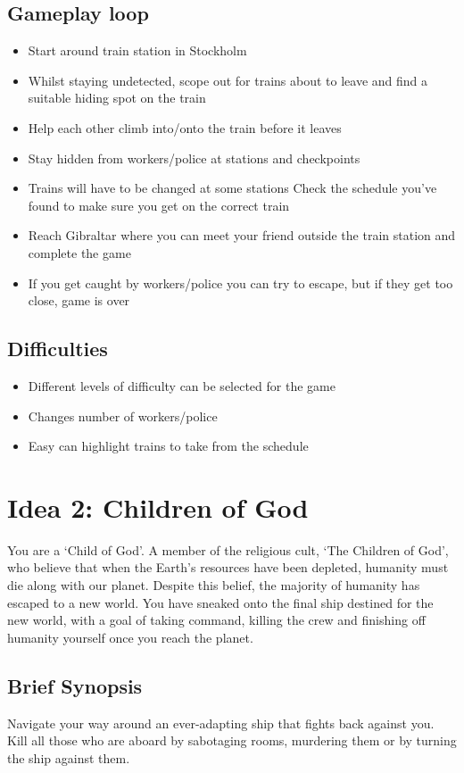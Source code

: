 \documentclass[a4paper]{article} %
\begin{document}
\subsection*{Gameplay loop}
\begin{itemize}
    \item Start around train station in Stockholm
    \item Whilst staying undetected, scope out for trains about to leave and find a suitable hiding spot on the train
    \item Help each other climb into/onto the train before it leaves
    \item Stay hidden from workers/police at stations and checkpoints
    \item Trains will have to be changed at some stations
    Check the schedule you’ve found to make sure you get on the correct train
    \item Reach Gibraltar where you can meet your friend outside the train station and complete the game
    \item If you get caught by workers/police you can try to escape, but if they get too close, game is over
\end{itemize}
\subsection*{Difficulties}
\begin{itemize}
    \item Different levels of difficulty can be selected for the game
    \item Changes number of workers/police
    \item Easy can highlight trains to take from the schedule
\end{itemize}
\section*{Idea 2: Children of God}
You are a ‘Child of God’. A member of the religious cult, ‘The Children of God’, who believe that when the Earth’s resources have been depleted, humanity must die along with our planet. Despite this belief, the majority of humanity has escaped to a new world. You have sneaked onto the final ship destined for the new world, with a goal of taking command, killing the crew and finishing off humanity yourself once you reach the planet.

\subsection*{Brief Synopsis}
Navigate your way around an ever-adapting ship that fights back against you. Kill all those who are aboard by sabotaging rooms, murdering them or by turning the ship against them.
\end{document}
